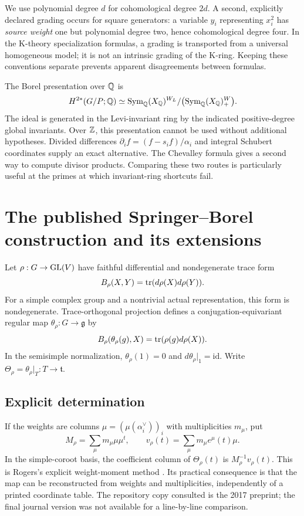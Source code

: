 We use polynomial degree $d$ for cohomological degree $2d$. A second, explicitly declared grading occurs for square generators: a variable $y_i$ representing $x_i^2$ has \emph{source weight} one but polynomial degree two, hence cohomological degree four. In the K-theory specialization formulas, a grading is transported from a universal homogeneous model; it is not an intrinsic grading of the K-ring. Keeping these conventions separate prevents apparent disagreements between formulas.

The Borel presentation over $\mathbb Q$ is
\[
 H^{2*}(G/P;\mathbb Q)\simeq
 \operatorname{Sym}_\mathbb Q(X_\mathbb Q)^{W_L}/\bigl(\operatorname{Sym}_\mathbb Q(X_\mathbb Q)^W_+\bigr).
\]
The ideal is generated in the Levi-invariant ring by the indicated positive-degree global invariants. Over $\mathbb Z$, this presentation cannot be used without additional hypotheses. Divided differences
$\partial_i f=(f-s_i f)/\alpha_i$ and integral Schubert coordinates supply an exact alternative. The Chevalley formula gives a second way to compute divisor products. Comparing these two routes is particularly useful at the primes at which invariant-ring shortcuts fail.


\section{The published Springer--Borel construction and its extensions}
Let $\rho:G\to\operatorname{GL}(V)$ have faithful differential and nondegenerate trace form
\[
 B_\rho(X,Y)=\operatorname{tr}(d\rho(X)d\rho(Y)).
\]
For a simple complex group and a nontrivial actual representation, this form is nondegenerate. Trace-orthogonal projection defines a conjugation-equivariant regular map $\theta_\rho:G\to\mathfrak g$ by
\[
 B_\rho(\theta_\rho(g),X)=\operatorname{tr}(\rho(g)d\rho(X)).
\]
In the semisimple normalization, $\theta_\rho(1)=0$ and $d\theta_\rho|_1=\mathrm{id}$. Write $\Theta_\rho=\theta_\rho|_T:T\to\mathfrak t$.

\subsection{Explicit determination}
If the weights are columns $\mu=(\mu(\alpha_i^\vee))_i$ with multiplicities $m_\mu$, put
\[
 M_\rho=\sum_\mu m_\mu\mu\mu^t,\qquad
 v_\rho(t)=\sum_\mu m_\mu e^\mu(t)\mu.
\]
In the simple-coroot basis, the coefficient column of $\Theta_\rho(t)$ is $M_\rho^{-1}v_\rho(t)$. This is Rogers's explicit weight-moment method \cite{Rogers}. Its practical consequence is that the map can be reconstructed from weights and multiplicities, independently of a printed coordinate table. The repository copy consulted is the 2017 preprint; the final journal version was not available for a line-by-line comparison.

